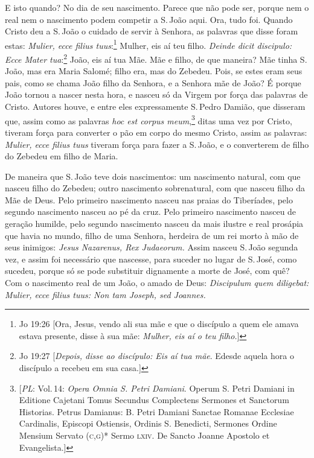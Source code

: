 E isto quando? No dia de seu nascimento. Parece que não pode ser, porque
nem o real nem o nascimento podem competir a S.\,João aqui. Ora, tudo
foi. Quando Cristo deu a S.\,João o cuidado de servir à Senhora, as
palavras que disse foram estas: \emph{Mulier, ecce filius tuus}:\footnote{Jo 19:26 [Ora, Jesus, vendo ali sua mãe e que o discípulo a quem ele amava estava presente, disse à sua mãe: \textit{Mulher, eis aí o teu filho.}]}
Mulher, eis aí teu filho.
\emph{Deinde dicit discipulo: Ecce Mater tua}:\footnote{Jo 19:27 [\textit{Depois, disse ao discípulo: Eis aí tua mãe}. Edesde aquela hora o discípulo a recebeu em sua casa.]} João, eis aí
tua Mãe. Mãe e filho, de que maneira? Mãe tinha S.\,João, mas era Maria
Salomé; filho era, mas do Zebedeu. Pois, se estes eram seus pais, como
se chama João filho da Senhora, e a Senhora mãe de João? É porque João
tornou a nascer nesta hora, e nasceu só da Virgem por força das palavras
de Cristo. Autores houve, e entre eles expressamente S.\,Pedro Damião,
que disseram que, assim como as palavras \emph{hoc est corpus
meum},\footnote{[\textit{PL}: Vol.\,14: \textit{Opera Omnia S. Petri Damiani}. Operum S. Petri Damiani in Editione Cajetani Tomus Secundus Complectens Sermones et Sanctorum Historias. Petrus Damianus: B. Petri Damiani Sanctae Romanae Ecclesiae Cardinalis, Episcopi Ostiensis, Ordinis S. Benedicti, Sermones Ordine Mensium Servato (\textsc{c,g})* Sermo \textsc{lxiv}. De Sancto Joanne Apostolo et Evangelista.]} ditas uma vez por Cristo, tiveram força para converter o
pão em corpo do mesmo Cristo, assim as palavras: \emph{Mulier, ecce
filius tuus} tiveram força para fazer a S.\,João, e o converterem de
filho do Zebedeu em filho de Maria.

De maneira que S.\,João teve dois nascimentos: um nascimento natural, com
que nasceu filho do Zebedeu; outro nascimento sobrenatural, com que
nasceu filho da Mãe de Deus. Pelo primeiro nascimento nasceu nas praias
do Tiberíades, pelo segundo nascimento nasceu ao pé da cruz. Pelo
primeiro nascimento nasceu de geração humilde, pelo segundo nascimento
nasceu da mais ilustre e real prosápia que havia no mundo, filho de uma
Senhora, herdeira de um rei morto à mão de seus inimigos: \emph{Jesus
Nazarenus, Rex Judaeorum.} Assim nasceu S.\,João segunda vez, e assim
foi necessário que nascesse, para suceder no lugar de S.\,José, como
sucedeu, porque só se pode substituir dignamente a morte de José, com
quê? Com o nascimento real de um João, o amado de Deus: \emph{Discipulum
quem diligebat: Mulier, ecce filius tuus: Non tam Joseph, sed Joannes.}

